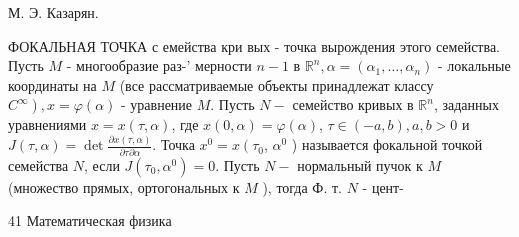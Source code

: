 \documentclass[10pt]{article}
\begin{document}
М. Э. Казарян.



ФОКАЛЬНАЯ ТОЧКА с емейства кри вых - точка вырождения этого семейства. Пусть $M$ - многообразие раз-' мерности $n-1$ в $\mathbb{R}^{n}, \alpha=\left(\alpha_{1}, \ldots, \alpha_{n}\right)$ - локальные координаты на $M$ (все рассматриваемые объекты принадлежат классу $\left.C^{\infty}\right), x=\varphi(\alpha)$ - уравнение $M$. Пусть $N-$ семейство кривых в $\mathbb{R}^{n}$, заданных уравнениями $x=x(\tau, \alpha)$, где $x(0, \alpha)=\varphi(\alpha)$, $\tau \in(-a, b), a, b>0$ и $J(\tau, \alpha)=\operatorname{det} \frac{\partial x(\tau, \alpha)}{\partial \tau \partial \alpha}$. Точка $x^{0}=x\left(\tau_{0}\right.$, $\alpha^{0}$ ) называется фокальной точкой семейства $N$, если $J\left(\tau_{0}, \alpha^{0}\right)=0$. Пусть $N-$ нормальный пучок к $M$ (множество прямых, ортогональных к $M$ ), тогда Ф. т. $N$ - цент-



41 Математическая физика
\end{document}
